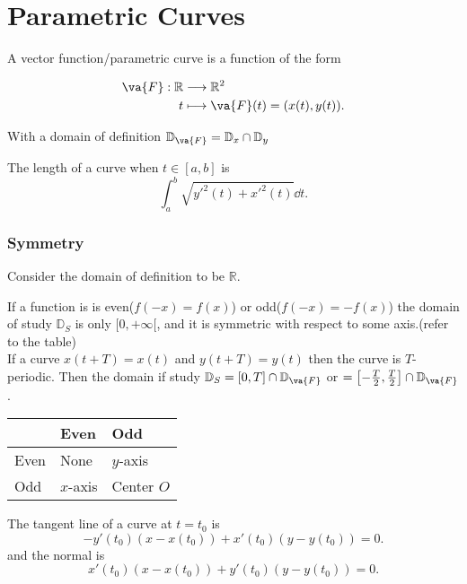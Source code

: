\documentclass[a4paper,12pt]{article}
\begin{document}
\part{Parametric Curves}

A vector function/parametric curve is a function of the form

\begin{align*}
	\va{F}: \mathbb{R} & \longrightarrow \mathbb{R}^2        \\
	t                  & \longmapsto \va{F}(t) = (x(t),y(t))
	.\end{align*}

With a domain of definition $\mathbb{D}_{\va{F}} = \mathbb{D}_x \cap \mathbb{D}_y$

\begin{remark}
    The length of a curve when $t\in[a,b]$ is 
    \[
        \int^b_a\sqrt{{y'}^2(t)+{x'}^2(t)} \dd {t} 
    .\] 

\end{remark}

\section{Symmetry}

Consider the domain of definition to be $\mathbb{R}$.

If a function is is even($f(-x)=f(x)$) or odd($f(-x)=-f(x)$) the domain of study $ \mathbb{D}_S$ is only $[0,+\infty[$, and it is symmetric with respect to some axis.(refer to the table)\\

If a curve $x(t+T)=x(t)$ and $y(t+T)=y(t)$ then the curve is  $T$-periodic. Then the domain if study $\mathbb{D}_S = [0,T]\cap\mathbb{D}_{\va{F}}$ or $=\left[-\frac{T}{2},\frac{T}{2}\right]\cap\mathbb{D}_{\va{F}}$.\\
\begin{margintable}
	\begin{tabular}{|l||l|l|}
		\hline
		\backslashbox{$y$}{$x$} & Even     & Odd        \\
		\hline\hline
		Even                    & None     & $y$-axis   \\
		\hline
		Odd                     & $x$-axis & Center $O$ \\
		\hline
	\end{tabular}
	\caption{Axis of symmetry of $\va{F}(t)$ depending on the nature of $x$ and $y$.}
\end{margintable}

\begin{remark}
	The tangent line of a curve at $t=t_0$ is
	\[
		-y'(t_0)(x-x(t_0)) + x'(t_0)(y-y(t_0))=0
		.\]
	and the normal is
	\[
		x'(t_0)(x-x(t_0))+y'(t_0)(y-y(t_0))=0
		.\]
\end{remark}
\end{document}
